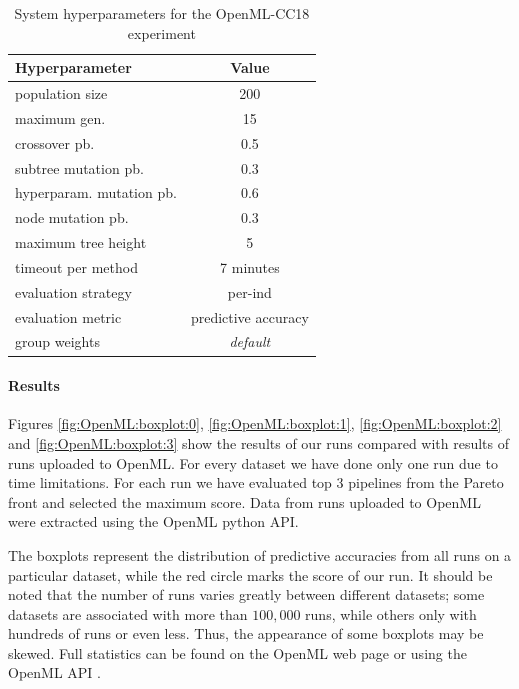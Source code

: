 \begin{table}[t]

\centering
\caption{System hyperparameters for the OpenML-CC18 experiment}\label{tab04:exp3:setting}
\begin{tabular}{l c}
\toprule
\textbf{\upshape Hyperparameter} & \textbf{Value} \\
\midrule
population size & 200 \\
maximum gen. & 15 \\
crossover pb. & 0.5 \\
subtree mutation pb. & 0.3 \\
hyperparam. mutation pb. & 0.6 \\
node mutation pb. & 0.3 \\
maximum tree height & 5 \\
timeout per method  & 7 minutes \\
evaluation strategy & per-ind \\
evaluation metric & predictive accuracy \\
group weights & \textit{default} \\
\bottomrule

\end{tabular}

\end{table}

\paragraph{Results}
Figures \ref{fig:OpenML:boxplot:0}, \ref{fig:OpenML:boxplot:1},
\ref{fig:OpenML:boxplot:2} and \ref{fig:OpenML:boxplot:3} show the results
of our runs compared with results of runs uploaded to OpenML. For every dataset
we have done only one run due to time limitations. For each run we have
evaluated top 3 pipelines from the Pareto front and selected the maximum score.
Data from runs uploaded to OpenML were extracted using the OpenML python API.

The boxplots represent the distribution of predictive accuracies from all runs
on a particular dataset, while the red circle marks the score of our run.
It should be noted that the number of runs varies
greatly between different datasets; some datasets are associated with more
than $100,000$ runs, while others only with hundreds of runs or even less. Thus,
the appearance of some boxplots may be skewed. Full statistics can be found on
the OpenML web page or using the OpenML API \citep{openmlcc18, openmlcc18docs}.

